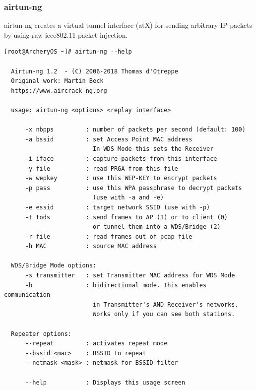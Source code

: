 \documentclass{article}
\begin{document}
\subsubsection{airtun-ng}
airtun-ng  creates  a virtual tunnel interface (atX) for sending arbitrary IP packets by using raw ieee802.11 packet injection.
\begin{lstlisting}
[root@ArcheryOS ~]# airtun-ng --help

  Airtun-ng 1.2  - (C) 2006-2018 Thomas d'Otreppe
  Original work: Martin Beck
  https://www.aircrack-ng.org

  usage: airtun-ng <options> <replay interface>

      -x nbpps         : number of packets per second (default: 100)
      -a bssid         : set Access Point MAC address
                         In WDS Mode this sets the Receiver
      -i iface         : capture packets from this interface
      -y file          : read PRGA from this file
      -w wepkey        : use this WEP-KEY to encrypt packets
      -p pass          : use this WPA passphrase to decrypt packets
                         (use with -a and -e)
      -e essid         : target network SSID (use with -p)
      -t tods          : send frames to AP (1) or to client (0)
                         or tunnel them into a WDS/Bridge (2)
      -r file          : read frames out of pcap file
      -h MAC           : source MAC address

  WDS/Bridge Mode options:
      -s transmitter   : set Transmitter MAC address for WDS Mode
      -b               : bidirectional mode. This enables communication
                         in Transmitter's AND Receiver's networks.
                         Works only if you can see both stations.

  Repeater options:
      --repeat         : activates repeat mode
      --bssid <mac>    : BSSID to repeat
      --netmask <mask> : netmask for BSSID filter

      --help           : Displays this usage screen
\end{lstlisting}
\end{document}
